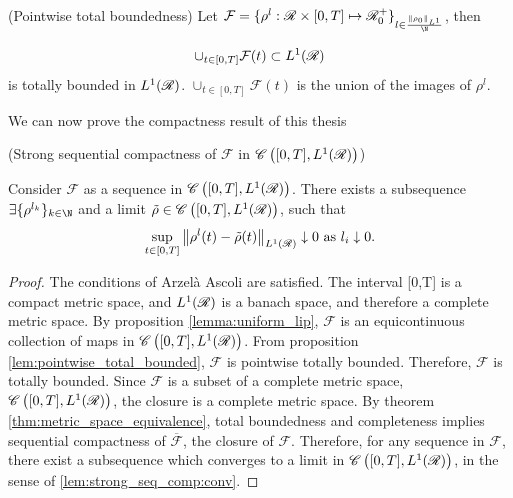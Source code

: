 \begin{lemma} (Pointwise total boundedness) \label{lem:pointwise_total_bounded}
	Let $\mathcal{F} = \{\rho^l: \R\times [0,T] \mapsto \R_0^+\}_{l \in \frac{\norm{\rho_0}_{L^1}}{\N}}$, then 
	
	\begin{equation}
		\cup_{t \in [0,T]}\mathcal{F}(t) \subset L^1(\mathscr{R})
	\end{equation}
	 is totally bounded in $L^1(\mathscr{R})$. $\cup_{t \in [0,T]}\mathcal{F}(t)$ is the union of the images of $\rho^l$. 
\end{lemma} 

We can now prove the compactness result of this thesis

\begin{lemma}(Strong sequential compactness of $\mathcal{F}$ in $\mathscr{C}\left([0,T], L^1(\mathscr{R})\right)$) \label{lem:strong_seq_comp}
	
	Consider $\mathcal{F}$ as a sequence in $\mathscr{C}\left([0,T], L^1(\mathscr{R})\right)$. There exists a subsequence  $\exists \{\rho^{l_k}\}_{k \in \N}$ and a limit $\tilde{\rho} \in \mathscr{C}\left([0,T], L^1(\mathscr{R})\right)$, such that 
	\begin{equation} \label{lem:strong_seq_comp:conv}
		\sup_{t \in [0,T]} \left\lVert\rho^l(t) - \tilde{\rho}(t)\right\rVert_{L^1(\mathscr{R})} \downarrow 0 \text{ as } l_i \downarrow 0. 
	\end{equation}
\end{lemma}
\begin{proof}
	The conditions of Arzelà Ascoli are satisfied. The interval [0,T] is a compact metric space, and $L^1(\mathscr{R})$ is a banach space, and therefore a complete metric space. By proposition \eqref{lemma:uniform_lip}, $\mathcal{F}$ is an equicontinuous collection of maps in $\mathscr{C}\left([0,T], L^1(\mathscr{R})\right)$. From proposition \eqref{lem:pointwise_total_bounded}, $\mathcal{F}$ is pointwise totally bounded. Therefore, $\mathcal{F}$ is totally bounded. Since $\mathcal{F}$ is a subset of a complete metric space, $\mathscr{C}\left([0,T], L^1(\mathscr{R})\right)$, the closure is a complete metric space. By theorem \eqref{thm:metric_space_equivalence}, total boundedness and completeness implies sequential compactness of $\overline{\mathcal{F}}$, the closure of $\mathcal{F}$. Therefore, for any sequence in $\mathcal{F}$, there exist a subsequence which converges to a limit in $\mathscr{C}\left([0,T], L^1(\mathscr{R})\right)$, in the sense of \eqref{lem:strong_seq_comp:conv}. 
\end{proof}


